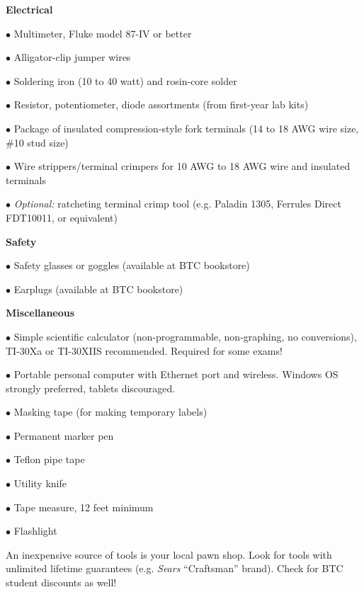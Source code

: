 \vskip 10pt

\noindent
{\bf Electrical}

\item{$\bullet$} Multimeter, Fluke model 87-IV or better
\item{$\bullet$} Alligator-clip jumper wires
\item{$\bullet$} Soldering iron (10 to 40 watt) and rosin-core solder
\item{$\bullet$} Resistor, potentiometer, diode assortments (from first-year lab kits)
\item{$\bullet$} Package of insulated compression-style fork terminals (14 to 18 AWG wire size, \#10 stud size)
\item{$\bullet$} Wire strippers/terminal crimpers for 10 AWG to 18 AWG wire and insulated terminals
\item{$\bullet$} {\it Optional:} ratcheting terminal crimp tool (e.g. Paladin 1305, Ferrules Direct FDT10011, or equivalent)
\medskip

\vskip 10pt

\noindent
{\bf Safety}

\item{$\bullet$} Safety glasses or goggles (available at BTC bookstore)
\item{$\bullet$} Earplugs (available at BTC bookstore)
\medskip

\vskip 10pt

\noindent
{\bf Miscellaneous}

\item{$\bullet$} Simple scientific calculator (non-programmable, non-graphing, no conversions), TI-30Xa or TI-30XIIS recommended.  Required for some exams!  %
\item{$\bullet$} Portable personal computer with Ethernet port and wireless.  Windows OS strongly preferred, tablets discouraged.
\item{$\bullet$} Masking tape (for making temporary labels)
\item{$\bullet$} Permanent marker pen
\item{$\bullet$} Teflon pipe tape
\item{$\bullet$} Utility knife
\item{$\bullet$} Tape measure, 12 feet minimum
\item{$\bullet$} Flashlight
\medskip

\vskip 10pt

An inexpensive source of tools is your local pawn shop.  Look for tools with unlimited lifetime guarantees (e.g. {\it Sears} ``Craftsman'' brand).  Check for BTC student discounts as well!



\vfil

\eject


